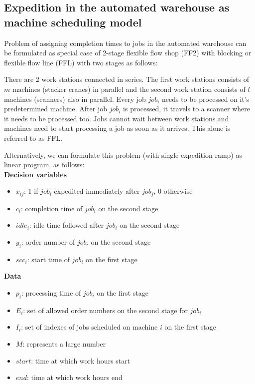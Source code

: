 \documentclass{ctuthesis}
\begin{document}
\subsection{Expedition in the automated warehouse as machine scheduling model}

Problem of assigning completion times to jobs in the automated warehouse can be formulated as special case of 2-stage flexible flow shop (FF2) with blocking or flexible flow line (FFL) with two stages as follows:

There are 2 work stations connected in series. The first work stations consists of $m$ machines (stacker cranes) in parallel and the second work station consists of $l$ machines (scanners) also in parallel. Every job $job_i$ needs to be processed on it's predetermined machine. After job $job_i$ is processed, it travels to a scanner where it needs to be processed too. Jobs cannot wait between work stations and machines need to start processing a job as soon as it arrives. This alone is referred to as FFL.

Alternatively, we can formulate this problem (with single expedition ramp) as linear program, as follows:\\
\textbf{Decision variables}

\begin{itemize}
\item $x_{ij}$: 1 if $job_i$ expedited immediately after $job_j$, 0 otherwise
\item$c_i$: completion time of $job_i$ on the second stage
\item$idle_i$: idle time followed after $job_i$ on the second stage
\item$y_i$: order number of $job_i$ on the second stage
\item$scc_i$: start time of $job_i$ on the first stage 
\end{itemize}
\textbf{Data}
\begin{itemize}
\item$p_i$: processing time of $job_i$ on the first stage
\item$E_i$: set of allowed order numbers on the second stage for $job_i$
\item$I_i$: set of indexes of jobs scheduled on machine $i$ on the first stage
\item$M$: represents a large number
\item$start$: time at which work hours start
\item$end$: time at which work hours end
\end{itemize}
\end{document}
